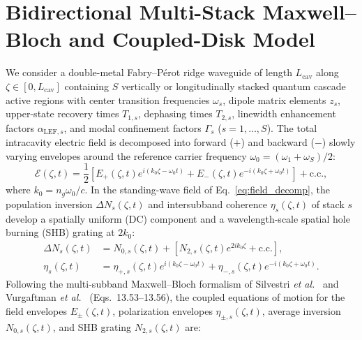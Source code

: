 \documentclass[11pt,letterpaper]{article}
\begin{document}
\section{Bidirectional Multi-Stack Maxwell--Bloch and Coupled-Disk Model}
\label{sec:model}

We consider a double-metal Fabry--P\'erot ridge waveguide of length $L_{\mathrm{cav}}$ along $\zeta \in [0, L_{\mathrm{cav}}]$ containing $S$ vertically or longitudinally stacked quantum cascade active regions with center transition frequencies $\omega_s$, dipole matrix elements $z_s$, upper-state recovery times $T_{1,s}$, dephasing times $T_{2,s}$, linewidth enhancement factors $\alpha_{\mathrm{LEF},s}$, and modal confinement factors $\Gamma_s$ ($s = 1, \dots, S$). The total intracavity electric field is decomposed into forward ($+$) and backward ($-$) slowly varying envelopes around the reference carrier frequency $\omega_0 = (\omega_1 + \omega_S)/2$:
\begin{equation}
\mathcal{E}(\zeta, t) = \frac{1}{2}\left[ E_+(\zeta, t) e^{i(k_0 \zeta - \omega_0 t)} + E_-(\zeta, t) e^{-i(k_0 \zeta + \omega_0 t)} \right] + \mathrm{c.c.},
\label{eq:field_decomp}
\end{equation}
where $k_0 = n_g \omega_0 / c$. In the standing-wave field of Eq.~\eqref{eq:field_decomp}, the population inversion $\Delta N_s(\zeta, t)$ and intersubband coherence $\eta_s(\zeta, t)$ of stack $s$ develop a spatially uniform (DC) component and a wavelength-scale spatial hole burning (SHB) grating at $2k_0$:
\begin{subequations}
\label{eq:shb_ansatz}
\begin{align}
\Delta N_s(\zeta, t) &= N_{0,s}(\zeta, t) + \left[ N_{2,s}(\zeta, t) e^{2 i k_0 \zeta} + \mathrm{c.c.} \right], \label{eq:shb_n}\\
\eta_s(\zeta, t) &= \eta_{+,s}(\zeta, t) e^{i(k_0 \zeta - \omega_0 t)} + \eta_{-,s}(\zeta, t) e^{-i(k_0 \zeta + \omega_0 t)}. \label{eq:shb_p}
\end{align}
\end{subequations}
Following the multi-subband Maxwell--Bloch formalism of Silvestri \textit{et al.}~\cite{Silvestri2023,SilvestriRoadmap2025} and Vurgaftman \textit{et al.}~\cite{Vurgaftman2021} (Eqs.~13.53--13.56), the coupled equations of motion for the field envelopes $E_\pm(\zeta, t)$, polarization envelopes $\eta_{\pm,s}(\zeta, t)$, average inversion $N_{0,s}(\zeta, t)$, and SHB grating $N_{2,s}(\zeta, t)$ are:
\end{document}
